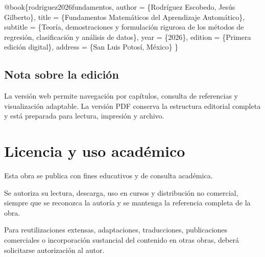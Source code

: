 \documentclass[
  spanish,
  10.5pt,
  letterpaper,
  DIV=11,
  numbers=noendperiod,
  oneside,
  open=any]{scrreprt}
\newenvironment{Shaded}{\begin{snugshade}}{\end{snugshade}}
\newcommand{\DataTypeTok}[1]{\textcolor[rgb]{0.68,0.00,0.00}{#1}}
\newcommand{\NormalTok}[1]{\textcolor[rgb]{0.00,0.23,0.31}{#1}}
\newcommand{\OtherTok}[1]{\textcolor[rgb]{0.00,0.23,0.31}{#1}}
\newcommand{\VariableTok}[1]{\textcolor[rgb]{0.07,0.07,0.07}{#1}}
\theoremstyle{definition}
\theoremstyle{definition}
\theoremstyle{plain}
\theoremstyle{remark}
\begin{document}

\begin{Shaded}
\begin{Highlighting}[numbers=left,,]
\VariableTok{@book}\NormalTok{\{}\OtherTok{rodriguez2026fundamentos}\NormalTok{,}
  \DataTypeTok{author}\NormalTok{    = \{Rodríguez Escobedo, Jesús Gilberto\},}
  \DataTypeTok{title}\NormalTok{     = \{Fundamentos Matemáticos del Aprendizaje Automático\},}
  \DataTypeTok{subtitle}\NormalTok{  = \{Teoría, demostraciones y formulación rigurosa de los métodos de regresión, clasificación y análisis de datos\},}
  \DataTypeTok{year}\NormalTok{      = \{2026\},}
  \DataTypeTok{edition}\NormalTok{   = \{Primera edición digital\},}
  \DataTypeTok{address}\NormalTok{   = \{San Luis Potosí, México\}}
\NormalTok{\}}
\end{Highlighting}
\end{Shaded}

\section*{Nota sobre la edición}\label{nota-sobre-la-ediciuxf3n}


La versión web permite navegación por capítulos, consulta de referencias
y visualización adaptable. La versión PDF conserva la estructura
editorial completa y está preparada para lectura, impresión y archivo.


\chapter*{Licencia y uso académico}\label{licencia-y-uso-acaduxe9mico}


Esta obra se publica con fines educativos y de consulta académica.

Se autoriza su lectura, descarga, uso en cursos y distribución no
comercial, siempre que se reconozca la autoría y se mantenga la
referencia completa de la obra.

Para reutilizaciones extensas, adaptaciones, traducciones, publicaciones
comerciales o incorporación sustancial del contenido en otras obras,
deberá solicitarse autorización al autor.
\end{document}
